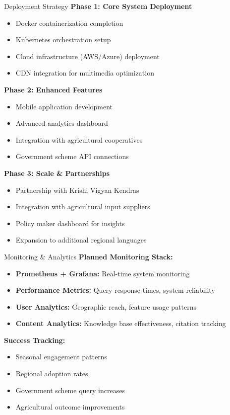 \documentclass[aspectratio=169]{beamer}
\begin{document}
\begin{frame}{Deployment Strategy}
\textbf{Phase 1: Core System Deployment}
\begin{itemize}
\item Docker containerization completion
\item Kubernetes orchestration setup
\item Cloud infrastructure (AWS/Azure) deployment
\item CDN integration for multimedia optimization
\end{itemize}

\textbf{Phase 2: Enhanced Features}
\begin{itemize}
\item Mobile application development
\item Advanced analytics dashboard
\item Integration with agricultural cooperatives
\item Government scheme API connections
\end{itemize}

\textbf{Phase 3: Scale \& Partnerships}
\begin{itemize}
\item Partnership with Krishi Vigyan Kendras
\item Integration with agricultural input suppliers
\item Policy maker dashboard for insights
\item Expansion to additional regional languages
\end{itemize}
\end{frame}

\begin{frame}{Monitoring \& Analytics}
\textbf{Planned Monitoring Stack:}
\begin{itemize}
\item \textbf{Prometheus + Grafana:} Real-time system monitoring
\item \textbf{Performance Metrics:} Query response times, system reliability
\item \textbf{User Analytics:} Geographic reach, feature usage patterns
\item \textbf{Content Analytics:} Knowledge base effectiveness, citation tracking
\end{itemize}

\textbf{Success Tracking:}
\begin{itemize}
\item Seasonal engagement patterns
\item Regional adoption rates
\item Government scheme query increases
\item Agricultural outcome improvements
\end{itemize}
\end{frame}
\end{document}
